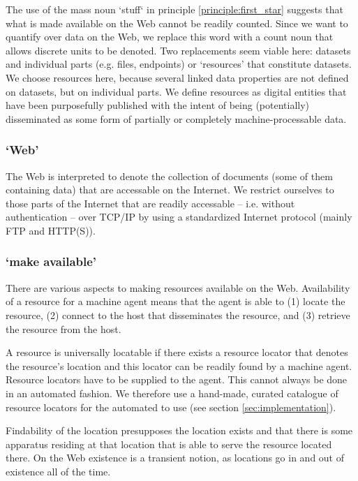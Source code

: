 The use of the mass noun `stuff` in principle \ref{principle:first_star}
 suggests that what is made available on the Web cannot be readily counted.
Since we want to quantify over data on the Web,
 we replace this word with a count noun
 that allows discrete units to be denoted.
Two replacements seem viable here: datasets and individual parts
 (e.g. files, endpoints) or `resources' that constitute datasets.
We choose resources here,
 because several linked data properties are not defined on datasets,
 but on individual parts.
We define resources as digital entities that have
 been purposefully published with the intent of being (potentially)
 disseminated as some form of partially or completely
 machine-processable data.

\subsubsection*{`Web'}

The Web is interpreted to denote the collection of documents
 (some of them containing data) that are accessable on the Internet.
We restrict ourselves to those parts of the Internet that are
 readily accessable -- i.e. without authentication --
 over TCP/IP by using a standardized Internet protocol
 (mainly FTP and HTTP(S)).

\subsubsection*{`make available'}

There are various aspects to making resources available on the Web.
Availability of a resource for a machine agent means that
 the agent is able to
 (1) locate the resource,
 (2) connect to the host that disseminates the resource, and
 (3) retrieve the resource from the host.

A resource is universally locatable if there exists a resource locator
 that denotes the resource's location
 and this locator can be readily found by a machine agent.
Resource locators have to be supplied to the agent.
This cannot always be done in an automated fashion.
We therefore use a hand-made, curated catalogue of resource locators
 for the automated to use (see section \ref{sec:implementation}).

Findability of the location presupposes the location exists
 and that there is some apparatus residing at that location that is able
 to serve the resource located there.
On the Web existence is a transient notion,
 as locations go in and out of existence all of the time.

